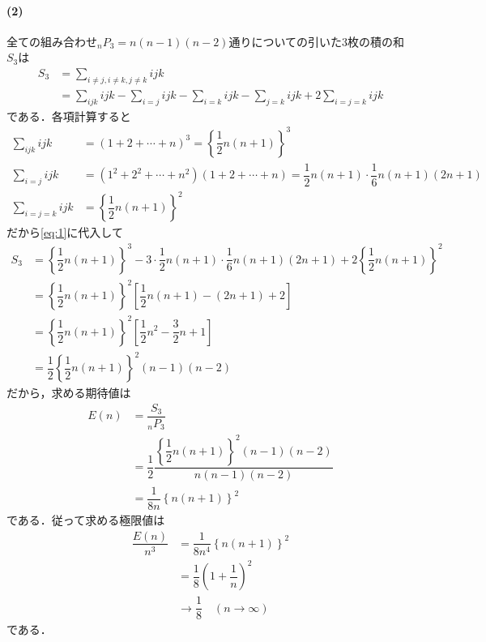 \documentclass[../../main.tex]{subfiles}
\begin{document}
\paragraph{(2)}
全ての組み合わせ${}_nP_3=n(n-1)(n-2)$通りについての引いた3枚の積の和$S_3$は
\begin{align}
  S_3
  &=\sum_{i\neq j, i\neq k, j\neq k} ijk \\
  &=\sum_{ijk} ijk - \sum_{i=j} ijk - \sum_{i=k}ijk - \sum_{j=k}ijk + 2\sum_{i=j=k}ijk \label{eq:1}
\end{align}
である．各項計算すると
\begin{align}
  \sum_{ijk} ijk  &= (1+2+\cdots+n)^3 = \left\{\dfrac{1}{2}n(n+1)\right\}^3 \\
  \sum_{i=j} ijk  &= (1^2+2^2+\cdots+n^2)(1+2+\cdots+n) = \dfrac{1}{2}n(n+1)\cdot\dfrac{1}{6}n(n+1)(2n+1) \\
  \sum_{i=j=k}ijk &= \left\{\dfrac{1}{2}n(n+1)\right\}^2
\end{align}
だから\cref{eq:1}に代入して
\begin{align}
  S_3
  &=\left\{\dfrac{1}{2}n(n+1)\right\}^3-3\cdot\dfrac{1}{2}n(n+1)\cdot\dfrac{1}{6}n(n+1)(2n+1)+2\left\{\dfrac{1}{2}n(n+1)\right\}^2 \\
  &=\left\{\dfrac{1}{2}n(n+1)\right\}^2\left[\dfrac{1}{2}n(n+1)-(2n+1)+2\right] \\
  &=\left\{\dfrac{1}{2}n(n+1)\right\}^2\left[\dfrac{1}{2}n^2-\dfrac{3}{2}n+1\right] \\
  &=\dfrac{1}{2}\left\{\dfrac{1}{2}n(n+1)\right\}^2\left(n-1\right)\left(n-2\right)
\end{align}
だから，求める期待値は
\begin{align}
  E(n)
  &= \dfrac{S_3}{{}_nP_3} \\
  &= \dfrac{1}{2}\dfrac{\left\{\dfrac{1}{2}n(n+1)\right\}^2\left(n-1\right)\left(n-2\right)}{n(n-1)(n-2)} \\
  &= \dfrac{1}{8n}\left\{n(n+1)\right\}^2
\end{align}
である．従って求める極限値は
\begin{align}
  \dfrac{E(n)}{n^3}
  &= \dfrac{1}{8n^4}\left\{n(n+1)\right\}^2 \\
  &= \dfrac{1}{8}\left(1+\dfrac{1}{n}\right)^2 \\
  &\to \dfrac{1}{8} \quad(n\to\infty)
\end{align}
である．
\end{document}

